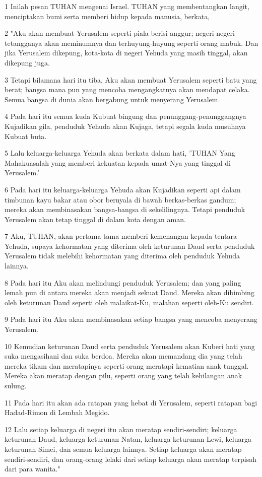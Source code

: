\par 1 Inilah pesan TUHAN mengenai Israel. TUHAN yang membentangkan langit, menciptakan bumi serta memberi hidup kepada manusia, berkata,
\par 2 "Aku akan membuat Yerusalem seperti piala berisi anggur; negeri-negeri tetangganya akan meminumnya dan terhuyung-huyung seperti orang mabuk. Dan jika Yerusalem dikepung, kota-kota di negeri Yehuda yang masih tinggal, akan dikepung juga.
\par 3 Tetapi bilamana hari itu tiba, Aku akan membuat Yerusalem seperti batu yang berat; bangsa mana pun yang mencoba mengangkatnya akan mendapat celaka. Semua bangsa di dunia akan bergabung untuk menyerang Yerusalem.
\par 4 Pada hari itu semua kuda Kubuat bingung dan penunggang-penunggangnya Kujadikan gila, penduduk Yehuda akan Kujaga, tetapi segala kuda musuhnya Kubuat buta.
\par 5 Lalu keluarga-keluarga Yehuda akan berkata dalam hati, 'TUHAN Yang Mahakuasalah yang memberi kekuatan kepada umat-Nya yang tinggal di Yerusalem.'
\par 6 Pada hari itu keluarga-keluarga Yehuda akan Kujadikan seperti api dalam timbunan kayu bakar atau obor bernyala di bawah berkas-berkas gandum; mereka akan membinasakan bangsa-bangsa di sekelilingnya. Tetapi penduduk Yerusalem akan tetap tinggal di dalam kota dengan aman.
\par 7 Aku, TUHAN, akan pertama-tama memberi kemenangan kepada tentara Yehuda, supaya kehormatan yang diterima oleh keturunan Daud serta penduduk Yerusalem tidak melebihi kehormatan yang diterima oleh penduduk Yehuda lainnya.
\par 8 Pada hari itu Aku akan melindungi penduduk Yerusalem; dan yang paling lemah pun di antara mereka akan menjadi sekuat Daud. Mereka akan dibimbing oleh keturunan Daud seperti oleh malaikat-Ku, malahan seperti oleh-Ku sendiri.
\par 9 Pada hari itu Aku akan membinasakan setiap bangsa yang mencoba menyerang Yerusalem.
\par 10 Kemudian keturunan Daud serta penduduk Yerusalem akan Kuberi hati yang suka mengasihani dan suka berdoa. Mereka akan memandang dia yang telah mereka tikam dan meratapinya seperti orang meratapi kematian anak tunggal. Mereka akan meratap dengan pilu, seperti orang yang telah kehilangan anak sulung.
\par 11 Pada hari itu akan ada ratapan yang hebat di Yerusalem, seperti ratapan bagi Hadad-Rimon di Lembah Megido.
\par 12 Lalu setiap keluarga di negeri itu akan meratap sendiri-sendiri; keluarga keturunan Daud, keluarga keturunan Natan, keluarga keturunan Lewi, keluarga keturunan Simei, dan semua keluarga lainnya. Setiap keluarga akan meratap sendiri-sendiri, dan orang-orang lelaki dari setiap keluarga akan meratap terpisah dari para wanita."

